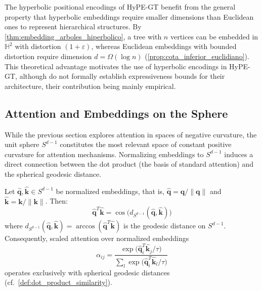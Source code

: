 \begin{remark}\label{rem:hypegt_expressiveness}
The hyperbolic positional encodings of HyPE-GT \citep{hypegt2023} benefit from the general property that hyperbolic embeddings require smaller dimensions than Euclidean ones to represent hierarchical structures. By \autoref{thm:embedding_arboles_hiperbolico}, a tree with $n$ vertices can be embedded in $\mathbb{H}^2$ with distortion $(1+\varepsilon)$, whereas Euclidean embeddings with bounded distortion require dimension $d = \Omega(\log n)$ (\autoref{prop:cota_inferior_euclidiano}). This theoretical advantage motivates the use of hyperbolic encodings in HyPE-GT, although \citet{hypegt2023} do not formally establish expressiveness bounds for their architecture, their contribution being mainly empirical.
\end{remark}

\subsection{Attention and Embeddings on the Sphere}\label{subsec:atencion_esfera}

While the previous section explores attention in spaces of negative curvature, the unit sphere $S^{d-1}$ constitutes the most relevant space of constant positive curvature for attention mechanisms. Normalizing embeddings to $S^{d-1}$ induces a direct connection between the dot product (the basis of standard attention) and the spherical geodesic distance.

\begin{proposition}\label{prop:dot_product_sphere}
Let $\hat{\mathbf{q}}, \hat{\mathbf{k}} \in S^{d-1}$ be normalized embeddings, that is, $\hat{\mathbf{q}} = \mathbf{q}/\|\mathbf{q}\|$ and $\hat{\mathbf{k}} = \mathbf{k}/\|\mathbf{k}\|$. Then:
\begin{equation}
\hat{\mathbf{q}}^T \hat{\mathbf{k}} = \cos\bigl(d_{S^{d-1}}(\hat{\mathbf{q}}, \hat{\mathbf{k}})\bigr)
\label{eq:dot_geodesic_sphere}
\end{equation}
where $d_{S^{d-1}}(\hat{\mathbf{q}}, \hat{\mathbf{k}}) = \arccos(\hat{\mathbf{q}}^T \hat{\mathbf{k}})$ is the geodesic distance on $S^{d-1}$. Consequently, scaled attention over normalized embeddings
\[
\alpha_{ij} = \frac{\exp\bigl(\hat{\mathbf{q}}_i^T \hat{\mathbf{k}}_j / \tau\bigr)}{\sum_l \exp\bigl(\hat{\mathbf{q}}_i^T \hat{\mathbf{k}}_l / \tau\bigr)}
\]
operates exclusively with spherical geodesic distances (cf.\ \autoref{def:dot_product_similarity}).
\end{proposition}

